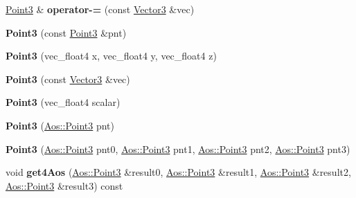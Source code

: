 \begin{DoxyCompactItemize}
\item 
\hypertarget{classVectormath_1_1Soa_1_1Point3_a98f7ae66ceec53f53c1e9fe6d52350d8}{\hyperlink{classVectormath_1_1Soa_1_1Point3}{Point3} \& {\bfseries operator-\/=} (const \hyperlink{classVectormath_1_1Soa_1_1Vector3}{Vector3} \&vec)}\label{classVectormath_1_1Soa_1_1Point3_a98f7ae66ceec53f53c1e9fe6d52350d8}

\item 
\hypertarget{classVectormath_1_1Soa_1_1Point3_aab495c0f0e3246b4505fb1539ba43fba}{{\bfseries Point3} (const \hyperlink{classVectormath_1_1Soa_1_1Point3}{Point3} \&pnt)}\label{classVectormath_1_1Soa_1_1Point3_aab495c0f0e3246b4505fb1539ba43fba}

\item 
\hypertarget{classVectormath_1_1Soa_1_1Point3_afa048556fb5733155f7570b98041c6aa}{{\bfseries Point3} (vec\-\_\-float4 x, vec\-\_\-float4 y, vec\-\_\-float4 z)}\label{classVectormath_1_1Soa_1_1Point3_afa048556fb5733155f7570b98041c6aa}

\item 
\hypertarget{classVectormath_1_1Soa_1_1Point3_a069cd5b9fcba74fd59d31745b43fd6cd}{{\bfseries Point3} (const \hyperlink{classVectormath_1_1Soa_1_1Vector3}{Vector3} \&vec)}\label{classVectormath_1_1Soa_1_1Point3_a069cd5b9fcba74fd59d31745b43fd6cd}

\item 
\hypertarget{classVectormath_1_1Soa_1_1Point3_a218e3dfa22fd1586999dc4a9a6839607}{{\bfseries Point3} (vec\-\_\-float4 scalar)}\label{classVectormath_1_1Soa_1_1Point3_a218e3dfa22fd1586999dc4a9a6839607}

\item 
\hypertarget{classVectormath_1_1Soa_1_1Point3_a7e914a6b7473102541aaa17017b62050}{{\bfseries Point3} (\hyperlink{classVectormath_1_1Aos_1_1Point3}{Aos\-::\-Point3} pnt)}\label{classVectormath_1_1Soa_1_1Point3_a7e914a6b7473102541aaa17017b62050}

\item 
\hypertarget{classVectormath_1_1Soa_1_1Point3_a59166c3fd55027427b8c2e130a71e907}{{\bfseries Point3} (\hyperlink{classVectormath_1_1Aos_1_1Point3}{Aos\-::\-Point3} pnt0, \hyperlink{classVectormath_1_1Aos_1_1Point3}{Aos\-::\-Point3} pnt1, \hyperlink{classVectormath_1_1Aos_1_1Point3}{Aos\-::\-Point3} pnt2, \hyperlink{classVectormath_1_1Aos_1_1Point3}{Aos\-::\-Point3} pnt3)}\label{classVectormath_1_1Soa_1_1Point3_a59166c3fd55027427b8c2e130a71e907}

\item 
\hypertarget{classVectormath_1_1Soa_1_1Point3_a1f95d915761ce2c5b9e5c96d5b2c88f2}{void {\bfseries get4\-Aos} (\hyperlink{classVectormath_1_1Aos_1_1Point3}{Aos\-::\-Point3} \&result0, \hyperlink{classVectormath_1_1Aos_1_1Point3}{Aos\-::\-Point3} \&result1, \hyperlink{classVectormath_1_1Aos_1_1Point3}{Aos\-::\-Point3} \&result2, \hyperlink{classVectormath_1_1Aos_1_1Point3}{Aos\-::\-Point3} \&result3) const }\label{classVectormath_1_1Soa_1_1Point3_a1f95d915761ce2c5b9e5c96d5b2c88f2}


\end{DoxyCompactItemize}
